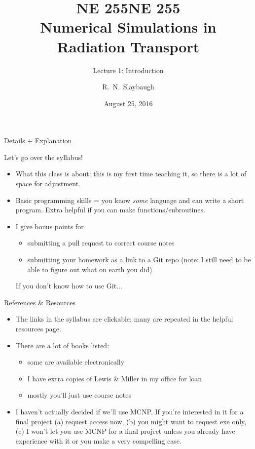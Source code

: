 \documentclass[xcolor=x11names,compress]{beamer}
\title{NE 255}
\author{R.\ N.\ Slaybaugh}
\date{August 25, 2016}
\renewcommand{\(}{\begin{columns}}
\renewcommand{\)}{\end{columns}}
\newcommand{\<}[1]{\begin{column}{#1}}
\renewcommand{\>}{\end{column}}
\begin{document}
\begin{frame}
\title{NE 255\\Numerical Simulations in Radiation Transport}
\subtitle{Lecture 1: Introduction}
\titlepage
\end{frame}

\begin{frame}{Details + Explanation}

Let's go over the syllabus!

\begin{itemize}
\item What this class is about: this is my first time teaching it, so there is a lot of space for adjustment.

\item Basic programming skills = you know \textit{some} language and can write a short program. Extra helpful if you can make functions/subroutines.

\item I give bonus points for
  \begin{itemize}
  \item submitting a pull request to correct course notes
  \item submitting your homework as a link to a Git repo (note: I still need to be able to figure out what on earth you did)
  \end{itemize}
If you don't know how to use Git...
\end{itemize}

\end{frame}

\begin{frame}{References \& Resources}

\begin{itemize}
\item The links in the syllabus are clickable; many are repeated in the helpful resources page.

\item There are a lot of books listed: 
  \begin{itemize}
  \item some are available electronically
  \item I have extra copies of Lewis \& Miller in my office for loan
  \item mostly you'll just use course notes 
  \end{itemize}

\item I haven't actually decided if we'll use MCNP. If you're interested in it for a final project (a) request access now, (b) you might want to request exe only, (c) I won't let you use MCNP for a final project unless you already have experience with it or you make a very compelling case. 
\end{itemize}

\end{frame}
\end{document}
